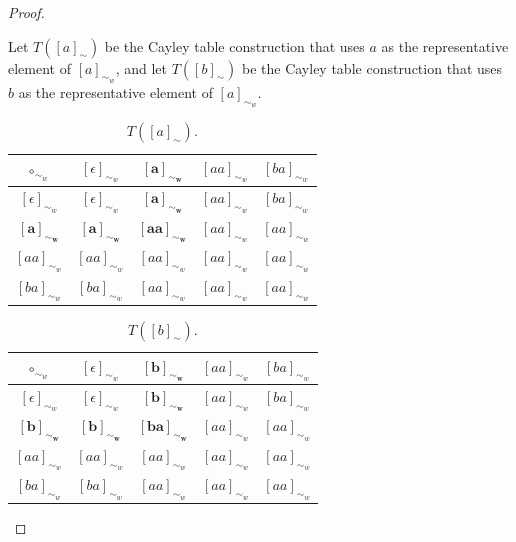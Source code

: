 \begin{proof}
\begin{enumerate}[(1)]
    Let $T([a]_{\sim})$ be the Cayley table construction that uses $a$ as the representative element of $[a]_{\sim_{w}}$, and let $T([b]_{\sim})$ be the Cayley table construction that uses $b$ as the representative element of $[a]_{\sim_{w}}$.
    \begin{table}[H]
        \centering
        \begin{tabular}{c|cccc}
            $\circ_{\sim_{w}}$              & $[\epsilon]_{\sim_{w}}$     & $\bm{[a]_{\sim_{w}}}$   & $[aa]_{\sim_{w}}$   & $[ba]_{\sim_{w}}$ \\
            \hline
            $[\epsilon]_{\sim_{w}}$        & $[\epsilon]_{\sim_{w}}$      & $\bm{[a]_{\sim_{w}}}$    & $[aa]_{\sim_{w}}$   & $[ba]_{\sim_{w}}$ \\
            $\bm{[a]_{\sim_{w}}}$          & $\bm{[a]_{\sim_{w}}}$        & $\bm{[aa]_{\sim_{w}}}$   & $[aa]_{\sim_{w}}$   & $[aa]_{\sim_{w}}$ \\
            $[aa]_{\sim_{w}}$              & $[aa]_{\sim_{w}}$            & $[aa]_{\sim_{w}}$   & $[aa]_{\sim_{w}}$   & $[aa]_{\sim_{w}}$ \\
            $[ba]_{\sim_{w}}$              & $[ba]_{\sim_{w}}$            & $[aa]_{\sim_{w}}$   & $[aa]_{\sim_{w}}$   & $[aa]_{\sim_{w}}$ \\
        \end{tabular}
        \caption{
        $T([a]_{\sim})$.
        }
    \end{table}
    \begin{table}[H]
        \centering
        \begin{tabular}{c|cccc}
            $\circ_{\sim_{w}}$              & $[\epsilon]_{\sim_{w}}$     & $\bm{[b]_{\sim_{w}}}$   & $[aa]_{\sim_{w}}$   & $[ba]_{\sim_{w}}$ \\
            \hline
            $[\epsilon]_{\sim_{w}}$        & $[\epsilon]_{\sim_{w}}$      & $\bm{[b]_{\sim_{w}}}$    & $[aa]_{\sim_{w}}$   & $[ba]_{\sim_{w}}$ \\
            $\bm{[b]_{\sim_{w}}}$          & $\bm{[b]_{\sim_{w}}}$        & $\bm{[ba]_{\sim_{w}}}$ & $[aa]_{\sim_{w}}$ & $[aa]_{\sim_{w}}$ \\
            $[aa]_{\sim_{w}}$              & $[aa]_{\sim_{w}}$            & $[aa]_{\sim_{w}}$   & $[aa]_{\sim_{w}}$   & $[aa]_{\sim_{w}}$ \\
            $[ba]_{\sim_{w}}$              & $[ba]_{\sim_{w}}$            & $[aa]_{\sim_{w}}$   & $[aa]_{\sim_{w}}$   & $[aa]_{\sim_{w}}$ \\
        \end{tabular}
        \caption{
        $T([b]_{\sim})$.
        }
    \end{table}
    

\end{enumerate}
\end{proof}

